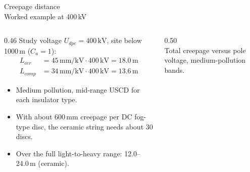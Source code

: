 \begin{frame}{Creepage distance\\Worked example at 400\,kV}
  \begin{columns}[T,onlytextwidth]
    \begin{column}{0.46\textwidth}
      {\small Study voltage $U_{dpe}=400\,\mathrm{kV}$, site below 1000\,m
      ($C_{a}=1$):}
      \[ \begin{aligned}
        L_{cer} &= 45\,\mathrm{mm/kV} \cdot 400\,\mathrm{kV} = 18.0\,\mathrm{m}\\[0.15em]
        L_{comp} &= 34\,\mathrm{mm/kV} \cdot 400\,\mathrm{kV} = 13.6\,\mathrm{m}
      \end{aligned} \]
      {\small
      \begin{itemize}
        \setlength{\itemsep}{0.3em}
        \item Medium pollution, mid-range USCD for each insulator type.
        \item With about 600\,mm creepage per DC fog-type disc, the ceramic
              string needs about 30 discs.
        \item Over the full light-to-heavy range: 12.0--24.0\,m (ceramic).
      \end{itemize}}
    \end{column}
    \begin{column}{0.50\textwidth}\centering
      \\[0.2em]
      {\color{atGray}\footnotesize Total creepage versus pole voltage,
      medium-pollution bands.}
    \end{column}
  \end{columns}
\end{frame}

